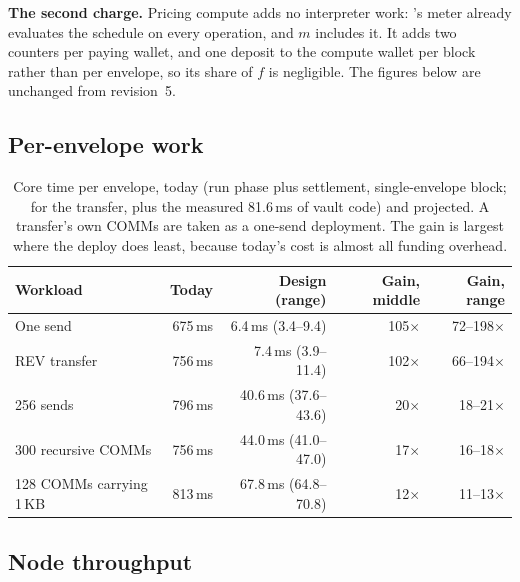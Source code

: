 \documentclass[11pt]{article}
\newcommand{\code}{\path}
\begin{document}
\textbf{The second charge.} Pricing compute adds no interpreter work: \code{dev}'s meter already evaluates the schedule on every operation, and $m$ includes it. It adds two counters per paying wallet, and one deposit to the compute wallet per block rather than per envelope, so its share of $f$ is negligible. The figures below are unchanged from revision~5.

\subsection{Per-envelope work}

\begin{table}[h]
\centering\small
\begin{tabular}{@{}lrrrr@{}}
\toprule
\textbf{Workload} & \textbf{Today} & \textbf{Design (range)} & \textbf{Gain, middle} & \textbf{Gain, range} \\
\midrule
One send & 675\,ms & 6.4\,ms (3.4--9.4) & 105$\times$ & 72--198$\times$ \\
REV transfer & 756\,ms & 7.4\,ms (3.9--11.4) & 102$\times$ & 66--194$\times$ \\
256 sends & 796\,ms & 40.6\,ms (37.6--43.6) & 20$\times$ & 18--21$\times$ \\
300 recursive COMMs & 756\,ms & 44.0\,ms (41.0--47.0) & 17$\times$ & 16--18$\times$ \\
128 COMMs carrying 1\,KB & 813\,ms & 67.8\,ms (64.8--70.8) & 12$\times$ & 11--13$\times$ \\
\bottomrule
\end{tabular}
\caption{Core time per envelope, today (run phase plus settlement, single-envelope block; for the transfer, plus the measured 81.6\,ms of vault code) and projected. A transfer's own COMMs are taken as a one-send deployment. The gain is largest where the deploy does least, because today's cost is almost all funding overhead.}
\label{tab:gain}
\end{table}

\subsection{Node throughput}
\end{document}

